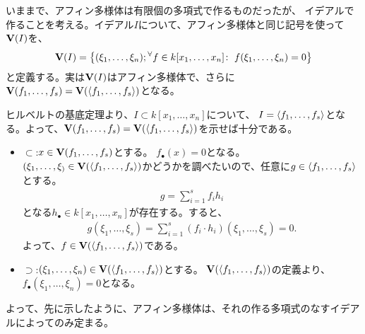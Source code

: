 いままで、アフィン多様体は有限個の多項式で作るものだったが、
イデアルで作ることを考える。イデアル$I$について、アフィン多様体と同じ記号を使って$\textbf V(I)$を、
\begin{align}
  \textbf V(I) = \left\{(\xi_1,\dots,\xi_n); {}^{\forall}{f\in k[x_1,\dots,x_n]}\mathrm{\colon\;} f(\xi_1,\dots,\xi_n) = 0\right\}
\end{align}
と定義する。実は$\textbf V(I)$はアフィン多様体で、さらに$\textbf V(f_1,\dots,f_s) = \textbf V(\left\langle f_1,\dots,f_s \right\rangle)$となる。
\begin{myproof}
ヒルベルトの基底定理より、$I\subset k[x_1,\dots,x_n]$について、
$I=\left\langle f_1,\dots,f_s \right\rangle$となる。よって、$\textbf V(f_1,\dots,f_s) = \textbf V(\left\langle f_1,\dots,f_s \right\rangle)$を示せば十分である。
\begin{itemize}
  \item $\subset$:$x\in \textbf V(f_1,\dots,f_s)$とする。
  $f_\bullet(x) = 0$となる。$(\xi_1,\dots,\xi_)\in \textbf V(\left\langle f_1,\dots,f_s \right\rangle)$かどうかを調べたいので、任意に$g\in \left\langle f_1,\dots,f_s \right\rangle$とする。
  \begin{align}
    g = \sum_{i=1}^s f_i h_i
  \end{align}
  となる$h_\bullet \in k[x_1,\dots,x_n]$が存在する。すると、
  \begin{align}
    g(\xi_1,\dots,\xi_s) = \sum_{i=1}^s (f_i \cdot h_i)(\xi_1,\dots,\xi_s) = 0.
  \end{align}
  よって、$f\in \textbf V(\left\langle f_1,\dots,f_s \right\rangle)$である。
  \item $\supset$:$(\xi_1,\dots,\xi_n) \in \textbf V(\left\langle f_1,\dots,f_s \right\rangle)$とする。
  $\textbf V(\left\langle f_1,\dots,f_s \right\rangle)$の定義より、
  $f_\bullet(\xi_1,\dots,\xi_n) = 0$となる。
\end{itemize}
\end{myproof}
よって、先に示したように、アフィン多様体は、それの作る多項式のなすイデアルによってのみ定まる。

